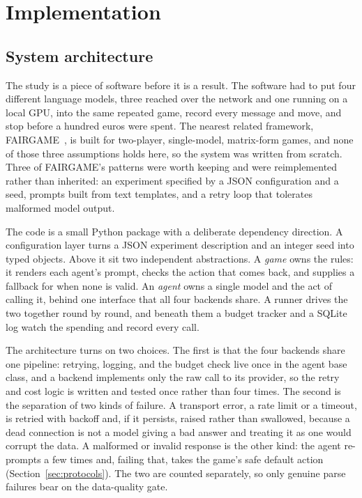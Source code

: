 \chapter{Implementation}
\label{ch:implementation}

\section{System architecture}
\label{sec:architecture}

The study is a piece of software before it is a result. The software had to put
four different language models, three reached over the network and one running on
a local GPU, into the same repeated game, record every message and move, and stop
before a hundred euros were spent. The nearest related framework,
FAIRGAME~\cite{fairgame2025}, is built for two-player, single-model, matrix-form
games, and none of those three assumptions holds here, so the system was written
from scratch. Three of FAIRGAME's patterns were worth keeping and were
reimplemented rather than inherited: an experiment specified by a JSON
configuration and a seed, prompts built from text templates, and a retry loop that
tolerates malformed model output.

The code is a small Python package with a deliberate dependency direction. A
configuration layer turns a JSON experiment description and an integer seed into
typed objects. Above it sit two independent abstractions. A \emph{game} owns the rules: it renders each agent's prompt, checks
the action that comes back, and supplies a fallback for when none is valid. An
\emph{agent} owns a single model and the act of calling it, behind one interface
that all four backends share. A runner drives the two together round by round, and
beneath them a budget tracker and a SQLite log watch the spending and record every
call.

The architecture turns on two choices. The first is that the four
backends share one pipeline: retrying, logging, and the budget check live once in
the agent base class, and a backend implements only the raw call to its provider,
so the retry and cost logic is written and tested once rather than four times. The
second is the separation of two kinds of failure. A transport error, a rate limit
or a timeout, is retried with backoff and, if it persists, raised rather than
swallowed, because a dead connection is not a model giving a bad answer and
treating it as one would corrupt the data. A malformed or invalid response is the
other kind: the agent re-prompts a few times and, failing that, takes the game's
safe default action (Section~\ref{sec:protocols}). The two are counted separately,
so only genuine parse failures bear on the data-quality gate.

